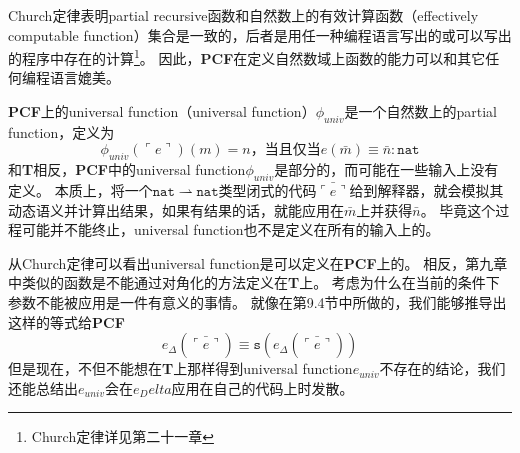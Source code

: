 Church定律表明\gls{partial recursive}函数和自然数上的有效计算函数（effectively computable function）集合是一致的，后者是用任一种编程语言写出的或可以写出的程序中存在的计算\footnote{Church定律详见第二十一章}。
因此，\textbf{PCF}在定义自然数域上函数的能力可以和其它任何编程语言媲美。

\textbf{PCF}上的\gls{universal function}（universal function）\(\phi_{univ}\)是一个自然数上的\gls{partial function}，定义为
\[
	\phi_{univ}(\ulcorner  e \urcorner)(m) = n \text{，当且仅当} e(\bar{m}) \equiv \bar{n}: \mathtt{nat}
\]
和\textbf{T}相反，\textbf{PCF}中的\gls{universal function}\(\phi_{univ}\)是部分的，而可能在一些输入上没有定义。
本质上，将一个\(\mathtt{nat} \rightharpoonup \mathtt{nat}\)类型闭式的代码\(\bar{\ulcorner e \urcorner}\)给到解释器，就会模拟其动态语义并计算出结果，如果有结果的话，就能应用在\(\bar{m}\)上并获得\(\bar{n}\)。
毕竟这个过程可能并不能终止，\gls{universal function}也不是定义在所有的输入上的。

从Church定律可以看出\gls{universal function}是可以定义在\textbf{PCF}上的。
相反，第九章中类似的函数是不能通过对角化的方法定义在\textbf{T}上。
考虑为什么在当前的条件下参数不能被应用是一件有意义的事情。
就像在第9.4节中所做的，我们能够推导出这样的等式给\textbf{PCF}
\[
	e_\Delta(\bar{\ulcorner e \urcorner}) \equiv \mathtt{s}(e_\Delta(\bar{\ulcorner e \urcorner}))
\]
但是现在，不但不能想在\textbf{T}上那样得到\gls{universal function}\(e_{univ}\)不存在的结论，我们还能总结出\(e_{univ}\)会在\(e_Delta\)应用在自己的代码上时发散。
